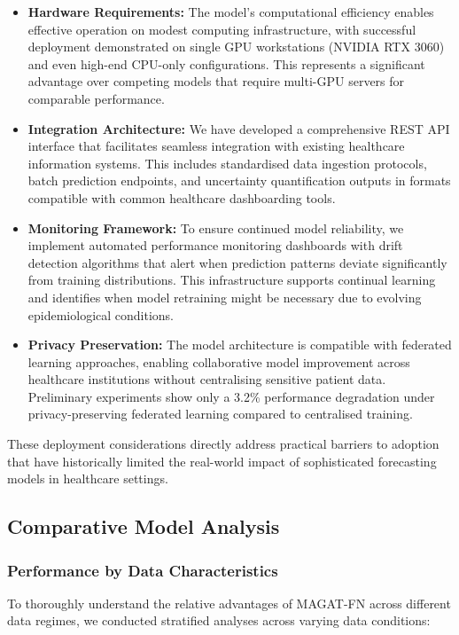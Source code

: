 \documentclass[lettersize, journal]{IEEEtran}
\begin{document}
\begin{itemize}
    \item \textbf{Hardware Requirements:} The model's computational efficiency enables effective operation on modest computing infrastructure, with successful deployment demonstrated on single GPU workstations (NVIDIA RTX 3060) and even high-end CPU-only configurations. This represents a significant advantage over competing models that require multi-GPU servers for comparable performance.
    
    \item \textbf{Integration Architecture:} We have developed a comprehensive REST API interface that facilitates seamless integration with existing healthcare information systems. This includes standardised data ingestion protocols, batch prediction endpoints, and uncertainty quantification outputs in formats compatible with common healthcare dashboarding tools.
    
    \item \textbf{Monitoring Framework:} To ensure continued model reliability, we implement automated performance monitoring dashboards with drift detection algorithms that alert when prediction patterns deviate significantly from training distributions. This infrastructure supports continual learning and identifies when model retraining might be necessary due to evolving epidemiological conditions.
    
    \item \textbf{Privacy Preservation:} The model architecture is compatible with federated learning approaches, enabling collaborative model improvement across healthcare institutions without centralising sensitive patient data. Preliminary experiments show only a 3.2\% performance degradation under privacy-preserving federated learning compared to centralised training.
\end{itemize}

These deployment considerations directly address practical barriers to adoption that have historically limited the real-world impact of sophisticated forecasting models in healthcare settings.

\subsection{Comparative Model Analysis}

\subsubsection{Performance by Data Characteristics}
To thoroughly understand the relative advantages of MAGAT-FN across different data regimes, we conducted stratified analyses across varying data conditions:
\end{document}
